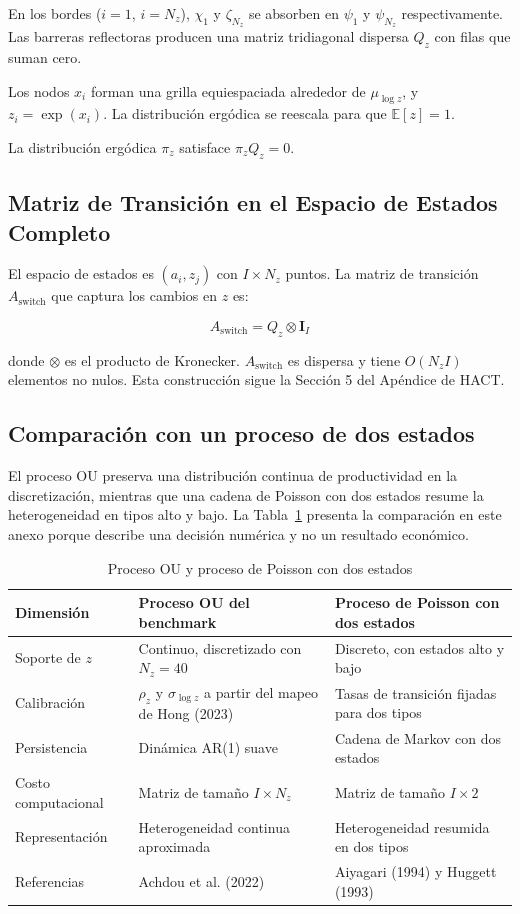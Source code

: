 \documentclass[12pt]{article}
\newcommand{\E}{\mathbb{E}}
\begin{document}
En los bordes ($i=1$, $i=N_z$), $\chi_1$ y $\zeta_{N_z}$ se absorben en $\psi_1$ y $\psi_{N_z}$ respectivamente. Las barreras reflectoras producen una matriz tridiagonal dispersa $Q_z$ con filas que suman cero.

Los nodos $x_i$ forman una grilla equiespaciada alrededor de $\mu_{\log z}$, y $z_i=\exp(x_i)$. La distribución ergódica se reescala para que $\E[z]=1$.

La distribución ergódica $\pi_z$ satisface $\pi_z Q_z = 0$.

\subsection{Matriz de Transición en el Espacio de Estados Completo}

El espacio de estados es $(a_i, z_j)$ con $I \times N_z$ puntos. La matriz de transición $A_{\text{switch}}$ que captura los cambios en $z$ es:

\begin{equation}\label{eq:Aswitch}
A_{\text{switch}} = Q_z \otimes \mathbf{I}_I
\end{equation}

donde $\otimes$ es el producto de Kronecker. $A_{\text{switch}}$ es dispersa y tiene $O(N_zI)$ elementos no nulos. Esta construcción sigue la Sección 5 del Apéndice de HACT.

\subsection{Comparación con un proceso de dos estados}

El proceso OU preserva una distribución continua de productividad en la discretización, mientras que una cadena de Poisson con dos estados resume la heterogeneidad en tipos alto y bajo. La Tabla~\ref{tab:ou-poisson} presenta la comparación en este anexo porque describe una decisión numérica y no un resultado económico.

\begin{table}[htbp]
\centering
\caption{Proceso OU y proceso de Poisson con dos estados}
\label{tab:ou-poisson}
\small
\begin{tabularx}{\textwidth}{lXX}
\toprule
Dimensión & Proceso OU del benchmark & Proceso de Poisson con dos estados \\
\midrule
Soporte de $z$ & Continuo, discretizado con $N_z=40$ & Discreto, con estados alto y bajo \\
Calibración & $\rho_z$ y $\sigma_{\log z}$ a partir del mapeo de Hong (2023) & Tasas de transición fijadas para dos tipos \\
Persistencia & Dinámica AR(1) suave & Cadena de Markov con dos estados \\
Costo computacional & Matriz de tamaño $I\times N_z$ & Matriz de tamaño $I\times2$ \\
Representación & Heterogeneidad continua aproximada & Heterogeneidad resumida en dos tipos \\
Referencias & Achdou et al. (2022) & Aiyagari (1994) y Huggett (1993) \\
\bottomrule
\end{tabularx}
\end{table}
\end{document}
